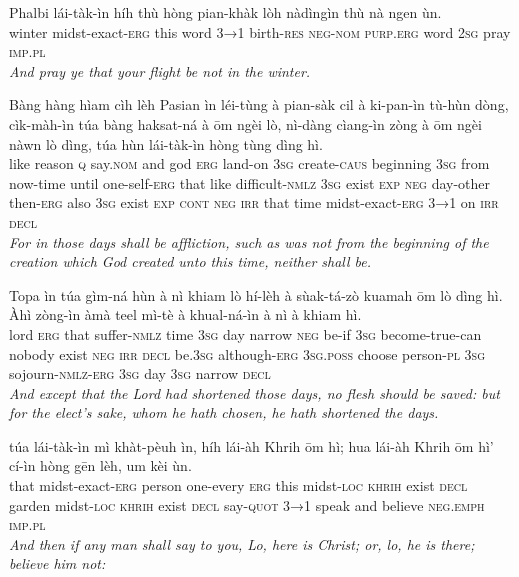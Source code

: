 \documentclass[11pt,a4paper]{article}
\begin{document}
\begin{exe}
\gll Phalbi lái-tàk-ìn híh thù hòng pian-khàk lòh nàdìngìn thù nà ngen ùn. \\
     winter midst-exact-\textsc{erg} this word \textsc{3→1} birth-\textsc{res} \textsc{neg}-\textsc{nom} \textsc{purp}.\textsc{erg} word \textsc{2sg} pray \textsc{imp}.\textsc{pl} \\
\glt \textcolor{kjvcolor}{\textit{And pray ye that your flight be not in the winter.}}

\gll Bàng hàng hìam cìh lèh Pasian ìn léi-tùng à pian-sàk cil à ki-pan-ìn tù-hùn dòng, cìk-màh-ìn túa bàng haksat-ná à ōm ngèi lò, nì-dàng cìang-ìn zòng à ōm ngèi nàwn lò dìng, túa hùn lái-tàk-ìn hòng tùng dìng hì. \\
     like reason \textsc{q} say.\textsc{nom} and god \textsc{erg} land-on \textsc{3sg} create-\textsc{caus} beginning \textsc{3sg} from now-time until one-self-\textsc{erg} that like difficult-\textsc{nmlz} \textsc{3sg} exist \textsc{exp} \textsc{neg} day-other then-\textsc{erg} also \textsc{3sg} exist \textsc{exp} \textsc{cont} \textsc{neg} \textsc{irr} that time midst-exact-\textsc{erg} \textsc{3→1} on \textsc{irr} \textsc{decl} \\
\glt \textcolor{kjvcolor}{\textit{For in those days shall be affliction, such as was not from the beginning of the creation which God created unto this time, neither shall be.}}

\gll Topa ìn túa gìm-ná hùn à nì khiam lò hí-lèh à sùak-tá-zò kuamah ōm lò dìng hì. Àhì zòng-ìn àmà teel mì-tè à khual-ná-ìn à nì à khiam hì. \\
     lord \textsc{erg} that suffer-\textsc{nmlz} time \textsc{3sg} day narrow \textsc{neg} be-if \textsc{3sg} become-true-can nobody exist \textsc{neg} \textsc{irr} \textsc{decl} be.\textsc{3sg} although-\textsc{erg} \textsc{3sg}.\textsc{poss} choose person-\textsc{pl} \textsc{3sg} sojourn-\textsc{nmlz}-\textsc{erg} \textsc{3sg} day \textsc{3sg} narrow \textsc{decl} \\
\glt \textcolor{kjvcolor}{\textit{And except that the Lord had shortened those days, no flesh should be saved: but for the elect's sake, whom he hath chosen, he hath shortened the days.}}

\gll túa lái-tàk-ìn mì khàt-pèuh ìn, híh lái-àh Khrih ōm hì; hua lái-àh Khrih ōm hì' cí-ìn hòng gēn lèh, um kèi ùn. \\
     that midst-exact-\textsc{erg} person one-every \textsc{erg} this midst-\textsc{loc} \textsc{khrih} exist \textsc{decl} garden midst-\textsc{loc} \textsc{khrih} exist \textsc{decl} say-\textsc{quot} \textsc{3→1} speak and believe \textsc{neg}.\textsc{emph} \textsc{imp}.\textsc{pl} \\
\glt \textcolor{kjvcolor}{\textit{And then if any man shall say to you, Lo, here is Christ; or, lo, he is there; believe him not:}}


\end{exe}
\end{document}
